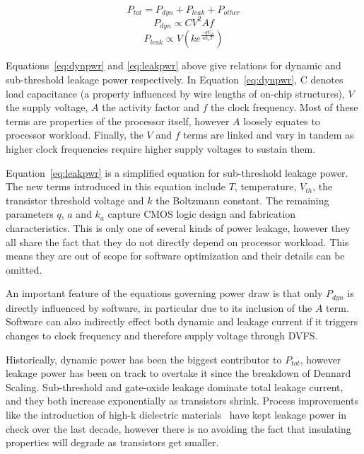 \begin{equation}
\label{eq:totpwr}
P_{tot} = P_{dyn} + P_{leak} + P_{other}
\end{equation}
\begin{equation} 
\label{eq:dynpwr}
P_{dyn} \propto CV^{2}Af
\end{equation}
\begin{equation}
\label{eq:leakpwr}
P_{leak} \propto V\left(ke^{\frac{-qV_{th}}{ak_{a}T}}\right)
\end{equation}

Equations~\ref{eq:dynpwr} and \ref{eq:leakpwr} above give relations for dynamic and sub-threshold leakage power respectively. In Equation~\ref{eq:dynpwr}, C denotes load capacitance (a property influenced by wire lengths of on-chip structures), $V$ the supply voltage, $A$ the activity factor and $f$ the clock frequency. Most of these terms are properties of the processor itself, however $A$ loosely equates to processor workload. Finally, the $V$ and $f$ terms are linked and vary in tandem as higher clock frequencies require higher supply voltages to sustain them. \golden

Equation~\ref{eq:leakpwr} is a simplified equation for sub-threshold leakage power. The new terms introduced in this equation include $T$, temperature, $V_{th}$, the transistor threshold voltage and $k$ the Boltzmann constant. The remaining parameters $q$, $a$ and $k_{a}$ capture CMOS logic design and fabrication characteristics. This is only one of several kinds of power leakage, however they all share the fact that they do not directly depend on processor workload. This means they are out of scope for software optimization and their details can be omitted.

An important feature of the equations governing power draw is that only $P_{dyn}$ is directly influenced by software, in particular due to its inclusion of the $A$ term. Software can also indirectly effect both dynamic and leakage current if it triggers changes to clock frequency and therefore supply voltage through DVFS. \golden

Historically, dynamic power has been the biggest contributor to $P_{tot}$, however leakage power has been on track to overtake it since the breakdown of Dennard Scaling.  Sub-threshold and gate-oxide leakage dominate total leakage current, and they both increase exponentially as transistors shrink. Process improvements like the introduction of high-k dielectric materials~\cite{jan:2009aa} have kept leakage power in check over the last decade, however there is no avoiding the fact that insulating properties will degrade as transistors get smaller. \golden

